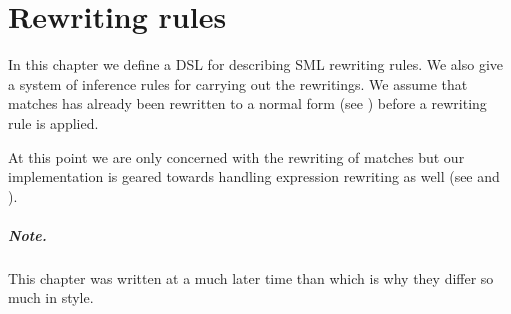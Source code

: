 \chapter{Rewriting rules}\label{chap:rewriting-rules}
In this chapter we define a DSL for describing SML rewriting rules. We also give
a system of inference rules for carrying out the rewritings. We assume that
matches has already been rewritten to a normal form (see )
before a rewriting rule is applied.

At this point we are only concerned with the rewriting of matches but our
implementation is geared towards handling expression rewriting as well (see
 and ).

\paragraph{Note.} This chapter was written at a much later time than
 which is why they differ so much in style.








